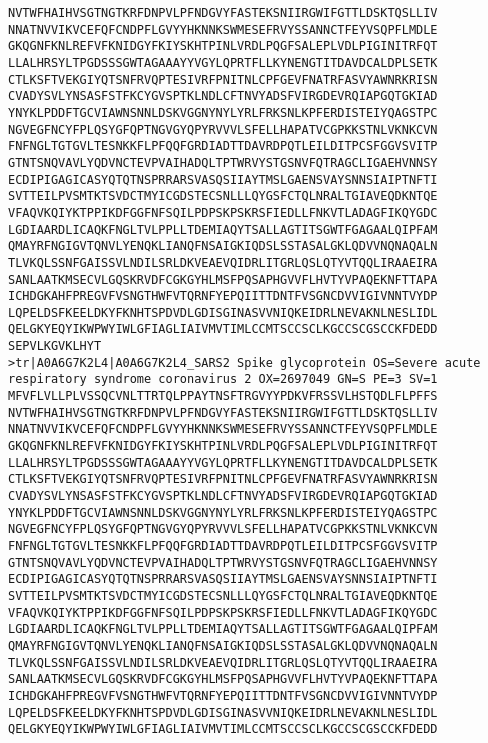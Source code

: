 \begin{lstlisting}
NVTWFHAIHVSGTNGTKRFDNPVLPFNDGVYFASTEKSNIIRGWIFGTTLDSKTQSLLIV
NNATNVVIKVCEFQFCNDPFLGVYYHKNNKSWMESEFRVYSSANNCTFEYVSQPFLMDLE
GKQGNFKNLREFVFKNIDGYFKIYSKHTPINLVRDLPQGFSALEPLVDLPIGINITRFQT
LLALHRSYLTPGDSSSGWTAGAAAYYVGYLQPRTFLLKYNENGTITDAVDCALDPLSETK
CTLKSFTVEKGIYQTSNFRVQPTESIVRFPNITNLCPFGEVFNATRFASVYAWNRKRISN
CVADYSVLYNSASFSTFKCYGVSPTKLNDLCFTNVYADSFVIRGDEVRQIAPGQTGKIAD
YNYKLPDDFTGCVIAWNSNNLDSKVGGNYNYLYRLFRKSNLKPFERDISTEIYQAGSTPC
NGVEGFNCYFPLQSYGFQPTNGVGYQPYRVVVLSFELLHAPATVCGPKKSTNLVKNKCVN
FNFNGLTGTGVLTESNKKFLPFQQFGRDIADTTDAVRDPQTLEILDITPCSFGGVSVITP
GTNTSNQVAVLYQDVNCTEVPVAIHADQLTPTWRVYSTGSNVFQTRAGCLIGAEHVNNSY
ECDIPIGAGICASYQTQTNSPRRARSVASQSIIAYTMSLGAENSVAYSNNSIAIPTNFTI
SVTTEILPVSMTKTSVDCTMYICGDSTECSNLLLQYGSFCTQLNRALTGIAVEQDKNTQE
VFAQVKQIYKTPPIKDFGGFNFSQILPDPSKPSKRSFIEDLLFNKVTLADAGFIKQYGDC
LGDIAARDLICAQKFNGLTVLPPLLTDEMIAQYTSALLAGTITSGWTFGAGAALQIPFAM
QMAYRFNGIGVTQNVLYENQKLIANQFNSAIGKIQDSLSSTASALGKLQDVVNQNAQALN
TLVKQLSSNFGAISSVLNDILSRLDKVEAEVQIDRLITGRLQSLQTYVTQQLIRAAEIRA
SANLAATKMSECVLGQSKRVDFCGKGYHLMSFPQSAPHGVVFLHVTYVPAQEKNFTTAPA
ICHDGKAHFPREGVFVSNGTHWFVTQRNFYEPQIITTDNTFVSGNCDVVIGIVNNTVYDP
LQPELDSFKEELDKYFKNHTSPDVDLGDISGINASVVNIQKEIDRLNEVAKNLNESLIDL
QELGKYEQYIKWPWYIWLGFIAGLIAIVMVTIMLCCMTSCCSCLKGCCSCGSCCKFDEDD
SEPVLKGVKLHYT
>tr|A0A6G7K2L4|A0A6G7K2L4_SARS2 Spike glycoprotein OS=Severe acute respiratory syndrome coronavirus 2 OX=2697049 GN=S PE=3 SV=1
MFVFLVLLPLVSSQCVNLTTRTQLPPAYTNSFTRGVYYPDKVFRSSVLHSTQDLFLPFFS
NVTWFHAIHVSGTNGTKRFDNPVLPFNDGVYFASTEKSNIIRGWIFGTTLDSKTQSLLIV
NNATNVVIKVCEFQFCNDPFLGVYYHKNNKSWMESEFRVYSSANNCTFEYVSQPFLMDLE
GKQGNFKNLREFVFKNIDGYFKIYSKHTPINLVRDLPQGFSALEPLVDLPIGINITRFQT
LLALHRSYLTPGDSSSGWTAGAAAYYVGYLQPRTFLLKYNENGTITDAVDCALDPLSETK
CTLKSFTVEKGIYQTSNFRVQPTESIVRFPNITNLCPFGEVFNATRFASVYAWNRKRISN
CVADYSVLYNSASFSTFKCYGVSPTKLNDLCFTNVYADSFVIRGDEVRQIAPGQTGKIAD
YNYKLPDDFTGCVIAWNSNNLDSKVGGNYNYLYRLFRKSNLKPFERDISTEIYQAGSTPC
NGVEGFNCYFPLQSYGFQPTNGVGYQPYRVVVLSFELLHAPATVCGPKKSTNLVKNKCVN
FNFNGLTGTGVLTESNKKFLPFQQFGRDIADTTDAVRDPQTLEILDITPCSFGGVSVITP
GTNTSNQVAVLYQDVNCTEVPVAIHADQLTPTWRVYSTGSNVFQTRAGCLIGAEHVNNSY
ECDIPIGAGICASYQTQTNSPRRARSVASQSIIAYTMSLGAENSVAYSNNSIAIPTNFTI
SVTTEILPVSMTKTSVDCTMYICGDSTECSNLLLQYGSFCTQLNRALTGIAVEQDKNTQE
VFAQVKQIYKTPPIKDFGGFNFSQILPDPSKPSKRSFIEDLLFNKVTLADAGFIKQYGDC
LGDIAARDLICAQKFNGLTVLPPLLTDEMIAQYTSALLAGTITSGWTFGAGAALQIPFAM
QMAYRFNGIGVTQNVLYENQKLIANQFNSAIGKIQDSLSSTASALGKLQDVVNQNAQALN
TLVKQLSSNFGAISSVLNDILSRLDKVEAEVQIDRLITGRLQSLQTYVTQQLIRAAEIRA
SANLAATKMSECVLGQSKRVDFCGKGYHLMSFPQSAPHGVVFLHVTYVPAQEKNFTTAPA
ICHDGKAHFPREGVFVSNGTHWFVTQRNFYEPQIITTDNTFVSGNCDVVIGIVNNTVYDP
LQPELDSFKEELDKYFKNHTSPDVDLGDISGINASVVNIQKEIDRLNEVAKNLNESLIDL
QELGKYEQYIKWPWYIWLGFIAGLIAIVMVTIMLCCMTSCCSCLKGCCSCGSCCKFDEDD

\end{lstlisting}
